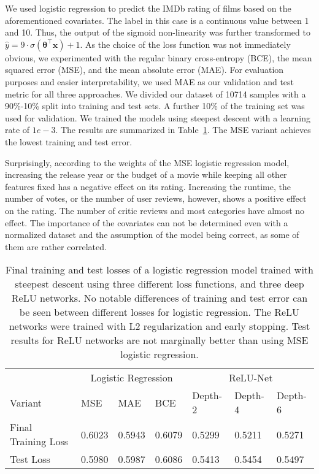 \documentclass{article}
\begin{document}
We used logistic regression to predict the IMDb rating of films based on the aforementioned covariates. The label in this case is a continuous value between 1 and 10. Thus, the output of the sigmoid non-linearity was further transformed to $\hat{y} = 9\cdot \sigma(\mathbf{\theta}^\top \mathbf{x}) + 1$. As the choice of the loss function was not immediately obvious, we experimented with the regular binary cross-entropy (BCE), the mean squared error (MSE), and the mean absolute error (MAE). For evaluation purposes and easier interpretability, we used MAE as our validation and test metric for all three approaches. We divided our dataset of 10714 samples with a 90\%-10\% split into training and test sets. A further 10\% of the training set was used for validation. We trained the models using steepest descent with a learning rate of $1e-3$. The results are summarized in Table~\ref{tab:losses}. The MSE variant achieves the lowest training and test error.

Surprisingly, according to the weights of the MSE logistic regression model, increasing the release year or the budget of a movie while keeping all other features fixed has a negative effect on its rating. Increasing the runtime, the number of votes, or the number of user reviews, however, shows a positive effect on the rating. The number of critic reviews and most categories have almost no effect. The importance of the covariates can not be determined even with a normalized dataset and the assumption of the model being correct, as some of them are rather correlated.

\begin{table}
  \caption{Final training and test losses of a logistic regression model trained with steepest descent using three different loss functions, and three deep ReLU networks. No notable differences of training and test error can be seen between different losses for logistic regression. The ReLU networks were trained with L2 regularization and early stopping. Test results for ReLU networks are not marginally better than using MSE logistic regression.}%
  \label{tab:losses}
  \centering
  \begin{tabular}{lllllll}
    \toprule
    {} & \multicolumn{3}{c}{Logistic Regression} & \multicolumn{3}{c}{ReLU-Net}       \\
    \cmidrule(r){2-7}
    Variant              & MSE   & MAE    & BCE    & Depth-2 & Depth-4 & Depth-6 \\
    \midrule
    Final Training Loss  & 0.6023 & 0.5943 & 0.6079 & 0.5299  & 0.5211  & 0.5271  \\
    Test Loss            & 0.5980 & 0.5987 & 0.6086 & 0.5413  & 0.5454  & 0.5497  \\
    \bottomrule
  \end{tabular}
\end{table}
\end{document}
